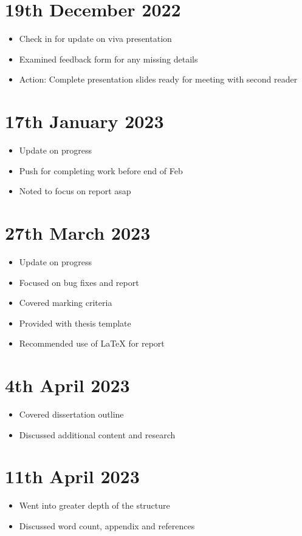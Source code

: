 \section{19th December 2022}
\begin{itemize}
    \item Check in for update on viva presentation
    \item Examined feedback form for any missing details
    \item Action: Complete presentation slides ready for meeting with second reader
\end{itemize}


\section{17th January 2023}
\begin{itemize}
    \item Update on progress
    \item Push for completing work before end of Feb
    \item Noted to focus on report asap
\end{itemize}

\section{27th March 2023}
\begin{itemize}
    \item Update on progress
    \item Focused on bug fixes and report
    \item Covered marking criteria
    \item Provided with thesis template
    \item Recommended use of LaTeX for report
\end{itemize}

\section{4th April 2023}
\begin{itemize}
    \item Covered dissertation outline
    \item Discussed additional content and research
\end{itemize}

\section{11th April 2023}
\begin{itemize}
    \item Went into greater depth of the structure
    \item Discussed word count, appendix and references
\end{itemize}

